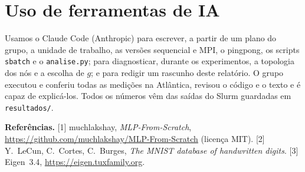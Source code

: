 \documentclass[10pt,a4paper,twocolumn]{article}
\newcommand{\cod}[1]{\texttt{\small #1}}
\begin{document}
\section{Uso de ferramentas de IA}
Usamos o Claude Code (Anthropic) para escrever, a partir de um plano do grupo, a unidade de
trabalho, as versões sequencial e MPI, o pingpong, os scripts \cod{sbatch} e o
\cod{analise.py}; para diagnosticar, durante os experimentos, a topologia dos nós e a escolha
de $g$; e para redigir um rascunho deste relatório. O grupo executou e conferiu todas as
medições na Atlântica, revisou o código e o texto e é capaz de explicá-los. Todos os números
vêm das saídas do Slurm guardadas em \cod{resultados/}.

\small
\noindent\textbf{Referências.} [1] muchlakshay, \emph{MLP-From-Scratch},
\url{https://github.com/muchlakshay/MLP-From-Scratch} (licença MIT).
[2] Y.~LeCun, C.~Cortes, C.~Burges, \emph{The MNIST database of handwritten digits}.
[3] Eigen~3.4, \url{https://eigen.tuxfamily.org}.
\end{document}
